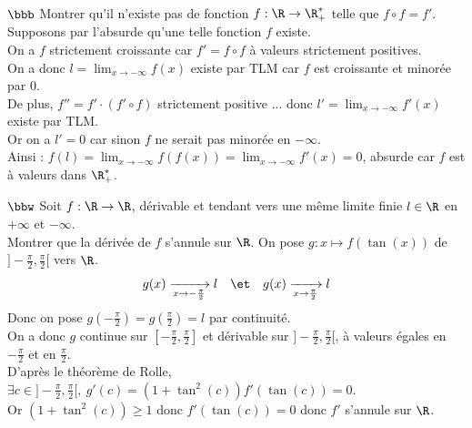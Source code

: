\documentclass[11pt]{article}
\begin{document}
\begin{exercice}{$\bbb$}{}
    Montrer qu'il n'existe pas de fonction $f:\R\to\R_+^*$ telle que $f\circ f = f'$.
    \tcblower
    Supposons par l'absurde qu'une telle fonction $f$ existe.\\
    On a $f$ strictement croissante car $f'=f\circ f$ à valeurs strictement positives.\\
    On a donc $l=\lim_{x\to-\infty} f(x)$ existe par TLM car $f$ est croissante et minorée par 0.\\
    De plus, $f''=f'\cdot(f'\circ f)$ strictement positive ... donc $l'=\lim_{x\to-\infty}f'(x)$ existe par TLM.\\
    Or on a $l'=0$ car sinon $f$ ne serait pas minorée en $-\infty$.\\
    Ainsi : $f(l)=\lim_{x\to-\infty}f(f(x))=\lim_{x\to-\infty}f'(x)=0$, absurde car $f$ est à valeurs dans $\R_+^*$.
\end{exercice}

\begin{exercice}{$\bbw$}{}
    Soit $f:\R\to\R$, dérivable et tendant vers une même limite finie $l\in\R$ en $+\infty$ et $-\infty$.\\
    Montrer que la dérivée de $f$ s'annule sur $\R$.
    \tcblower
    On pose $g:x\mapsto f(\tan(x))$ de $]-\frac{\pi}{2},\frac{\pi}{2}[$ vers $\R$.
    \begin{equation*}
        g(x)\xrightarrow[x\to-\frac{\pi}{2}]{}l \quad\et\quad g(x)\xrightarrow[x\to\frac{\pi}{2}]{}l
    \end{equation*}
    Donc on pose $g(-\frac{\pi}{2})=g(\frac{\pi}{2})=l$ par continuité.\\
    On a donc $g$ continue sur $[-\frac{\pi}{2},\frac{\pi}{2}]$ et dérivable sur $]-\frac{\pi}{2},\frac{\pi}{2}[$, à valeurs égales en $-\frac{\pi}{2}$ et en $\frac{\pi}{2}$.\\
    D'après le théorème de Rolle, $\exists c \in ]-\frac{\pi}{2},\frac{\pi}{2}[, ~ g'(c)=(1+\tan^2(c))f'(\tan(c))=0$.\\
    Or $(1+\tan^2(c))\geq1$ donc $f'(\tan(c))=0$ donc $f'$ s'annule sur $\R$.
\end{exercice}
\end{document}
